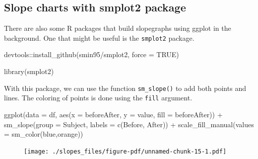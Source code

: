 \documentclass[
  letterpaper,
  DIV=11,
  numbers=noendperiod]{scrreprt}
\newenvironment{Shaded}{\begin{snugshade}}{\end{snugshade}}
\newcommand{\AttributeTok}[1]{\textcolor[rgb]{0.40,0.45,0.13}{#1}}
\newcommand{\ConstantTok}[1]{\textcolor[rgb]{0.56,0.35,0.01}{#1}}
\newcommand{\FunctionTok}[1]{\textcolor[rgb]{0.28,0.35,0.67}{#1}}
\newcommand{\NormalTok}[1]{\textcolor[rgb]{0.00,0.23,0.31}{#1}}
\newcommand{\SpecialCharTok}[1]{\textcolor[rgb]{0.37,0.37,0.37}{#1}}
\newcommand{\StringTok}[1]{\textcolor[rgb]{0.13,0.47,0.30}{#1}}
\begin{document}
\hypertarget{slope-charts-with-smplot2-package}{%
\subsection{Slope charts with smplot2
package}\label{slope-charts-with-smplot2-package}}

There are also some R packages that build slopegraphs using ggplot in
the background. One that might be useful is the \texttt{smplot2}
package.

\begin{Shaded}
\begin{Highlighting}[]
\NormalTok{devtools}\SpecialCharTok{::}\FunctionTok{install\_github}\NormalTok{(}\StringTok{\textquotesingle{}smin95/smplot2\textquotesingle{}}\NormalTok{, }\AttributeTok{force =} \ConstantTok{TRUE}\NormalTok{)}
\end{Highlighting}
\end{Shaded}

\begin{Shaded}
\begin{Highlighting}[]
\FunctionTok{library}\NormalTok{(smplot2)}
\end{Highlighting}
\end{Shaded}

With this package, we can use the function \texttt{sm\_slope()} to add
both points and lines. The coloring of points is done using the
\texttt{fill} argument.

\begin{Shaded}
\begin{Highlighting}[]
\FunctionTok{ggplot}\NormalTok{(}\AttributeTok{data =}\NormalTok{ df, }\FunctionTok{aes}\NormalTok{(}\AttributeTok{x =}\NormalTok{ beforeAfter, }\AttributeTok{y =}\NormalTok{ value, }\AttributeTok{fill =}\NormalTok{ beforeAfter)) }\SpecialCharTok{+}
  \FunctionTok{sm\_slope}\NormalTok{(}\AttributeTok{group =}\NormalTok{ Subject,}
           \AttributeTok{labels =} \FunctionTok{c}\NormalTok{(}\StringTok{\textquotesingle{}Before\textquotesingle{}}\NormalTok{, }\StringTok{\textquotesingle{}After\textquotesingle{}}\NormalTok{)) }\SpecialCharTok{+}
  \FunctionTok{scale\_fill\_manual}\NormalTok{(}\AttributeTok{values =}  \FunctionTok{sm\_color}\NormalTok{(}\StringTok{\textquotesingle{}blue\textquotesingle{}}\NormalTok{,}\StringTok{\textquotesingle{}orange\textquotesingle{}}\NormalTok{))}
\end{Highlighting}
\end{Shaded}

\begin{figure}[H]

{\centering \texttt{[image: ./slopes\_files/figure-pdf/unnamed-chunk-15-1.pdf]}

}

\end{figure}
\end{document}
